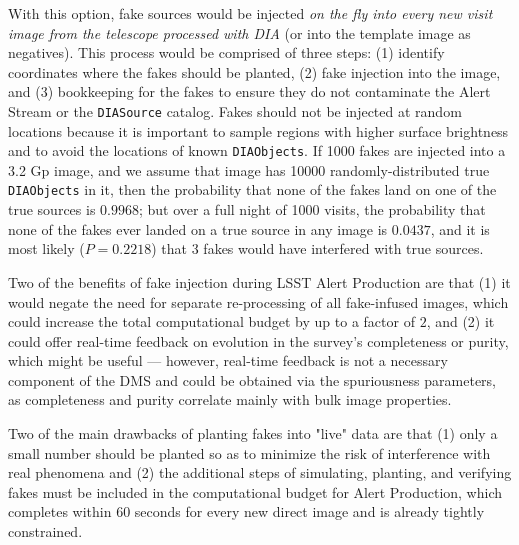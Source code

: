 \documentclass[DM,lsstdraft,toc]{lsstdoc}
\begin{document}
With this option, fake sources would be injected {\it on the fly into every new visit image from the telescope processed with DIA} (or into the template image as negatives). This process would be comprised of three steps: (1) identify coordinates where the fakes should be planted, (2) fake injection into the image, and (3) bookkeeping for the fakes to ensure they do not contaminate the Alert Stream or the {\tt DIASource} catalog. Fakes should not be injected at random locations because it is important to sample regions with higher surface brightness and to avoid the locations of known {\tt DIAObjects}. If 1000 fakes are injected into a 3.2 Gp image, and we assume that image has 10000 randomly-distributed true {\tt DIAObjects} in it, then the probability that none of the fakes land on one of the true sources is $0.9968$; but over a full night of 1000 visits, the probability that none of the fakes ever landed on a true source in any image is $0.0437$, and it is most likely ($P=0.2218$) that 3 fakes would have interfered with true sources. 

Two of the benefits of fake injection during LSST Alert Production are that (1) it would negate the need for separate re-processing of all fake-infused images, which could increase the total computational budget by up to a factor of $2$, and (2) it could offer real-time feedback on evolution in the survey's completeness or purity, which might be useful --- however, real-time feedback is not a necessary component of the DMS and could be obtained via the spuriousness parameters, as completeness and purity correlate mainly with bulk image properties.

Two of the main drawbacks of planting fakes into "live" data are that (1) only a small number should be planted so as to minimize the risk of interference with real phenomena and (2) the additional steps of simulating, planting, and verifying fakes must be included in the computational budget for Alert Production, which completes within $60$ seconds for every new direct image and is already tightly constrained. 
\end{document}
